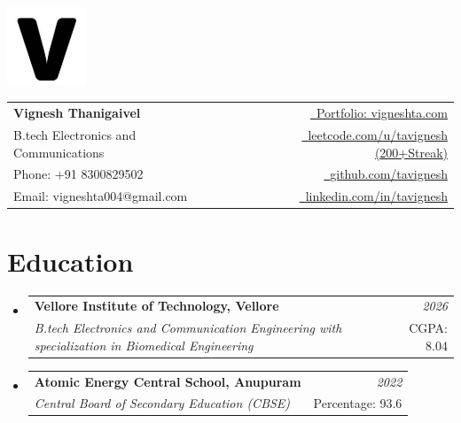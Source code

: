 \documentclass[a4paper,11pt]{article}
\makeatletter
\newcommand{\resumeSubheading}[4]{
\vspace{0.5mm}\item
    \begin{tabular*}{0.98\textwidth}[t]{l@{\extracolsep{\fill}}r}
        \textbf{#1} & \textit{\footnotesize{#4}} \\
        \textit{\footnotesize{#3}} &  \footnotesize{#2}\\
    \end{tabular*}
    \vspace{-2.4mm}
}
\newcommand{\resumeSubHeadingListStart}{\begin{itemize}[leftmargin=*,labelsep=0mm]}
\newcommand{\resumeSubHeadingListEnd}{\end{itemize}\vspace{2mm}}
\newcommand{\name}{Vignesh Thanigaivel} %
\newcommand{\roll}{B.tech Electronics and Communications} %
\newcommand{\phone}{Portfolio: vigneshta.com}
\newcommand{\emailb}{leetcode.com/u/tavignesh (200+Streak)} %
\makeatother
\begin{document}
\selectfont


\parbox{2.35cm}{%
\includegraphics[width=2.35cm,clip]{v.png}}
\parbox{\dimexpr\linewidth-2.8cm\relax}{
\begin{tabularx}{\linewidth}{L r} \\
  \textbf{\Large \name} & \href{https://vigneshta.com}{\raisebox{0.0\height}{\footnotesize \faGlobe}\ \phone}\\
  {\roll} & \href{https://leetcode.com/u/tavignesh/}{\raisebox{0.0\height}{\footnotesize \faCode}\ {\emailb}} \\
  {Phone: +91 8300829502} &  \href{https://github.com/tavignesh/}{\raisebox{0.0\height}{\footnotesize \faGithub}\ {github.com/tavignesh}} \\
  {Email: vigneshta004@gmail.com } & \href{https://www.linkedin.com/in/tavignesh}{\raisebox{0.0\height}{\footnotesize \faLinkedin}\ {linkedin.com/in/tavignesh}}
\end{tabularx}
}



\section{\textbf{Education}}
  \resumeSubHeadingListStart
    \resumeSubheading
      {Vellore Institute of Technology, Vellore}{CGPA: 8.04}
      {B.tech Electronics and Communication Engineering with specialization in Biomedical Engineering}{2026}
    \resumeSubheading
      {Atomic Energy Central School, Anupuram}{Percentage: 93.6}
      {Central Board of Secondary Education (CBSE)}{2022}
  \resumeSubHeadingListEnd
\vspace{-5.5mm}
%


\end{document}
